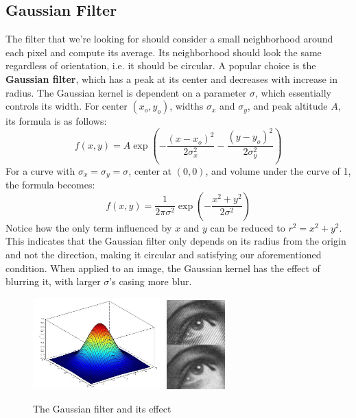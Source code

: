 \documentclass{article}
\begin{document}
\subsection{Gaussian Filter}
The filter that we're looking for should consider a small neighborhood around each pixel and compute its average. Its neighborhood should look the same regardless of orientation, i.e. it should be circular. A popular choice is the \textbf{Gaussian filter}, which has a peak at its center and decreases with increase in radius. The Gaussian kernel is dependent on a parameter $\sigma$, which essentially controls its width. For center $(x _ { o }, y _ { o })$, widths $\sigma _ { x }$ and $\sigma _ { y }$, and peak altitude $A$, its formula is as follows:
\[f ( x , y ) = A \exp \left( - \frac { ( x - x _ { o } ) ^ { 2 } } { 2 \sigma _ { x } ^ { 2 } } - \frac { ( y - y _ { o } ) ^ { 2 } } { 2 \sigma _ { y } ^ { 2 } } \right)\]
For a curve with $\sigma _ { x } = \sigma _ { y } = \sigma$, center at $(0, 0)$, and volume under the curve of 1, the formula becomes:
\[f ( x , y ) = \frac { 1 } { 2 \pi \sigma ^ 2} \exp \left( - \frac { x ^ 2 + y ^ 2 } { 2 \sigma ^ { 2 } } \right)\]
Notice how the only term influenced by $x$ and $y$ can be reduced to $r^2=x^2+y^2$. This indicates that the Gaussian filter only depends on its radius from the origin and not the direction, making it circular and satisfying our aforementioned condition. When applied to an image, the Gaussian kernel has the effect of blurring it, with larger $\sigma$'s casing more blur.
\begin{figure}[!htb]
    \begin{center}
        \includegraphics[width=0.45\textwidth]{gaussiankernel.jpg}
        \includegraphics[width=0.2\textwidth]{blur.jpg}
    \end{center}
    \vspace{-10pt}
    \caption{The Gaussian filter and its effect}
\end{figure}
\end{document}
